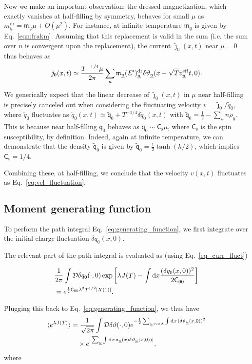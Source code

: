 \documentclass[
twocolumn,
amsfonts,
showpacs,
superscriptaddress,
amsmath,
amssymb,
aps,
longbibliography,
prl,
noeprint
]{revtex4-2}
\newcommand{\ch}[1]{{\color{black}  #1}}
\newcommand{\Tx}{{x}}
\newcommand{\bveff}{\bar{v}^\eff}
\newcommand{\n}{\nonumber\\}
\newcommand{\dd}{{\rm d}}
\newcommand{\1}{{\bf 1}}
\newcommand{\eff}{{\rm eff}}
\begin{document}
Now we make an important observation: the dressed magnetization, which exactly vanishes at half-filling by symmetry, behaves for small $\mu$ as $m^\mathrm{dr}_{\underline{u}}= \mathfrak{m}_{\underline{u}}\mu + O(\mu^{2})$. For instance, at infinite temperature $\mathfrak{m}_{\underline{u}}$ is given by Eq.~\eqref{eqn:frakm}. Assuming that this replacement is valid in the sum (i.e. the sum over $n$ is convergent upon the replacement), the current $\tilde{\jmath}_0(x,t)$ near $\mu=0$ thus behaves as
\begin{equation}
\tilde{\jmath}_0(x,t)\simeq\frac{T^{-1/4}\mu}{2\pi}\sum_{\underline{u}}\mathfrak{m}_{\underline{u}}(E')^{\mathrm{dr}}_{\underline{u}}\delta\vartheta_{\underline{u}}(x-\sqrt{T}\bveff_{\underline{u}}t,0).
\end{equation}
We generically expect that the linear decrease of $\tilde{\jmath}_0(x,t)$ in $\mu$ near half-filling is precisely canceled out when considering the fluctuating velocity $v=\tilde{\jmath}_0/\tilde{q}_0$, where $\tilde{q}_0$ fluctuates as $\tilde{q}_0(x,t)\simeq\tilde{\mathsf{q}}_0+T^{-1/4}\delta\tilde{q}_0(x,t)$ with $\tilde{\mathsf{q}}_0=\frac{1}{2}-\sum_{\underline{u}}n\rho_{\underline{u}}$. This is because near half-filling $\tilde{\mathsf{q}}_0$ behaves as $\tilde{\mathsf{q}}_0\sim \mathsf{C}_\mathrm{s} \mu$, where $\mathsf{C}_\mathrm{s}$ is the spin susceptibility, by definition. Indeed, again at infinite temperature, we can demonstrate that the density $\tilde{\mathsf{q}}_0$ is given by $\tilde{\mathsf{q}}_0=\tfrac{1}{2}\tanh{(h/2)}$, which implies $\mathsf{C}_\mathrm{s}=1/4$.

Combining these, at half-filling, we conclude that the velocity $v(x,t)$ fluctuates as Eq.~\eqref{eq:vel_fluctuation}.

\subsection{Moment generating function}
To perform the path integral Eq.~\eqref{eq:generating_function}, we first integrate over the initial charge \ch{fluctuation} $\delta q_0(x,0)$. \ch{The relevant part of the path integral is evaluated as (using Eq.~\eqref{eq_curr_fluct})

\begin{align}
    &\frac{1}{2\pi}\int\mathcal{D}\delta q_0(\cdot,0)\exp\left[\lambda J(T) - \int\dd \Tx \frac{(\delta q_0(\Tx,0))^2}{2\mathsf{C}_{00}} \right] \n
    &=e^{\frac{1}{2}\mathsf{C}_{00}\lambda^2T^{1/2}|X(1)|}.
\end{align}}
Plugging this back to Eq.~\eqref{eq:generating_function}, we thus have
\begin{align}\label{eq:theta_integral}
    \langle e^{\lambda J(T)}\rangle&=\frac{1}{\sqrt{2\pi}}\int\mathcal{D}\delta\vartheta(\cdot,0) e^{-\frac{1}{2}\sum_{\underline{u}:n<\Lambda}\int\dd x\,(\delta\vartheta_{\underline{u}}(x,0))^2}\n
    &\quad\times e^{|\sum_{\underline{u}}\int\dd x\,a_{\underline{u}}(x)\delta\vartheta_{\underline{u}}(x,0))|},
\end{align}
where
\end{document}

